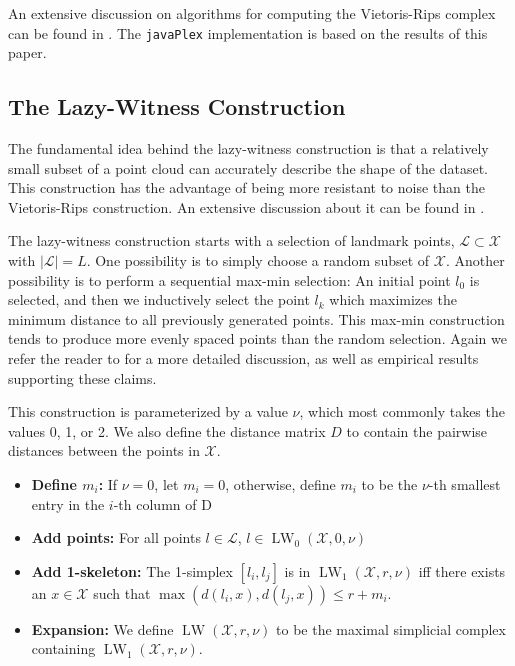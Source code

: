 \documentclass{gts2012}
\newcommand\javaPlex{\texttt{javaPlex}\xspace}
\newcommand{\LW}{\operatorname{LW}}
\begin{document}
An extensive discussion on algorithms for computing the Vietoris-Rips complex can be found in \cite{Zomorodian}. The \javaPlex implementation is based on the results of this paper.

\subsection{The Lazy-Witness Construction}
The fundamental idea behind the lazy-witness construction is that a relatively small subset of a point cloud can accurately describe the shape of the dataset. This construction has the advantage of being more resistant to noise than the Vietoris-Rips construction. An extensive discussion about it can be found in \cite{Witness}. 

The lazy-witness construction starts with a selection of landmark points, $\mathcal{L} \subset \mathcal{X}$ with $|\mathcal{L}| = L$. One possibility is to simply choose a random subset of $\mathcal{X}$. Another possibility is to perform a sequential max-min selection: An initial point $l_0$ is selected, and then we inductively select the point $l_k$ which maximizes the minimum distance to all previously generated points. This max-min construction tends to produce more evenly spaced points than the random selection. Again we refer the reader to \cite{Witness} for a more detailed discussion, as well as empirical results supporting these claims.

This construction is parameterized by a value $\nu$, which most commonly takes the values 0, 1, or 2. We also define the distance matrix $D$ to contain the pairwise distances between the points in $\mathcal{X}$. 

\begin{itemize}
\item {\bf Define $m_i$:} If $\nu = 0$, let $m_i = 0$, otherwise, define $m_i$ to be the $\nu$-th smallest entry in the $i$-th column of D
\item {\bf Add points:} For all points $l \in \mathcal{L}$, $l \in \LW_0(\mathcal{X}, 0, \nu)$
\item {\bf Add 1-skeleton:} The 1-simplex $[l_i, l_j]$ is in $\LW_1(\mathcal{X}, r, \nu)$ iff there exists an $x \in \mathcal{X}$ such that $\max(d(l_i, x), d(l_j, x)) \leq r + m_i$.
\item {\bf Expansion:} We define $\LW(\mathcal{X}, r, \nu)$ to be the maximal simplicial complex containing $\LW_1(\mathcal{X}, r, \nu)$. 
\end{itemize}
\end{document}
